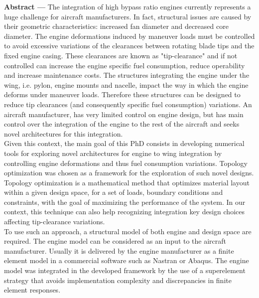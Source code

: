 {\large\textbf{Abstract ---}}
The integration of high bypass ratio engines currently represents a huge challenge for aircraft manufacturers. In fact, structural issues are caused by their geometric characteristics: increased fan diameter and decreased core diameter. The engine deformations induced by maneuver loads must be controlled to avoid excessive variations of the clearances between rotating blade tips and the fixed engine casing. These clearances are known as "tip-clearance" and if not controlled can increase the engine specific fuel consumption, reduce operability and increase maintenance costs.  The structures integrating the engine under the wing, i.e. pylon, engine mounts and nacelle, impact the way in which the engine deforms under maneuver loads. Therefore these structures can be designed to reduce tip clearances (and consequently specific fuel consumption) variations.  An aircraft manufacturer, has very limited control on engine design, but has main control over the integration of the engine to the rest of the aircraft and seeks novel architectures for this integration. \\
Given this context, the main goal of this PhD consists in developing numerical tools for exploring novel architectures for engine to wing integration by controlling engine deformations and thus fuel consumption variations. Topology optimization was chosen as a framework for the exploration of such novel designs.
Topology optimization is a mathematical method that optimizes material layout within a given design space, for a set of loads, boundary conditions and constraints, with the goal of maximizing the performance of the system.
In our context, this technique can also help recognizing integration key design choices affecting tip-clearance variations.\\
To use such an approach, a structural model of both engine and design space are required. The engine model can be considered as an input to the aircraft manufacturer. Usually it is delivered by the engine manufacturer as a finite element model in a commercial software such as Nastran or Abaqus. The engine model was integrated in the developed framework by the use of a superelement strategy that avoids implementation complexity and discrepancies in finite element responses. \\
